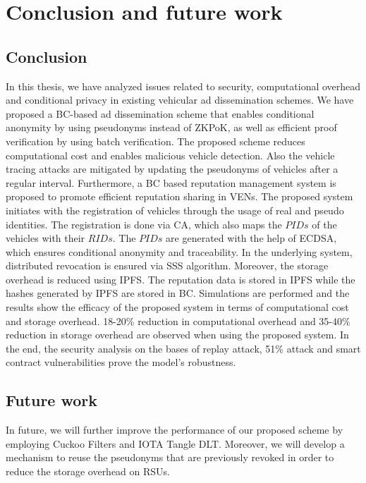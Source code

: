 \chapter[Conclusion and future work]{Conclusion and future work}
\label{chp:6}
\renewcommand{\bibname}{Conclusion}
\newpage
\section{Conclusion}
In this thesis, we have analyzed issues related to security, computational overhead and conditional privacy in existing vehicular ad dissemination schemes. We have proposed a BC-based ad dissemination scheme that enables conditional anonymity by using pseudonyms instead of ZKPoK, as well as efficient proof verification by using batch verification. The proposed scheme reduces computational cost and enables malicious vehicle detection. Also the vehicle tracing attacks are mitigated by updating the pseudonyms of vehicles after a regular interval. Furthermore, a BC based reputation management system is proposed to promote efficient reputation sharing in VENs. The proposed system initiates with the registration of vehicles through the usage of real and pseudo identities. The registration is done via CA, which also maps the $PIDs$ of the vehicles with their $RIDs$. The $PIDs$ are generated with the help of ECDSA, which ensures conditional anonymity and traceability. In the underlying system, distributed revocation is ensured via SSS algorithm. Moreover, the storage overhead is reduced using IPFS. The reputation data is stored in IPFS while the hashes generated by IPFS are stored in BC. Simulations are performed and the results show the efficacy of the proposed system in terms of computational cost and storage overhead. 18-20\% reduction in computational overhead and 35-40\% reduction in storage overhead are observed when using the proposed system. In the end, the security analysis on the bases of replay attack, 51\% attack and smart contract vulnerabilities prove the model's robustness.

\section{Future work}
In future, we will further improve the performance of our proposed scheme by employing Cuckoo Filters and IOTA Tangle DLT. Moreover, we will develop a mechanism to reuse the pseudonyms that are previously revoked in order to reduce the storage overhead on RSUs.